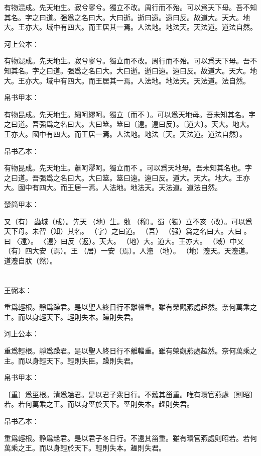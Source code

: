 \documentclass[a5paper]{ctexbook}
\begin{document}
    有物混成。先天地生。寂兮寥兮。獨立不改。周行而不殆。可以爲天下母。吾不知其名。字之曰道。强爲之名曰大。大曰逝。逝曰遠。遠曰反。故道大。天大。地大。王亦大。域中有四大。而王居其一焉。人法地。地法天。天法道。道法自然。

    河上公本：

    有物混成。先天地生。寂兮寥兮。獨立而不改。周行而不殆。可以爲天下母。吾不知其名。字之曰道。强爲之名曰大。大曰逝。逝曰遠。遠曰反。故道大。天大。地大。王亦大。域中有四大。而王居其一焉。人法地。地法天。天法道。法自然。

    帛书甲本：

    有物昆成。先天地生。繡呵繆呵。獨立〔而不󱁡〕。可以爲天地母。吾未知其名。字之曰道。吾强爲之名曰大。大曰筮。筮曰〔遠。遠曰反〕。〔道大〕。天大。地大。王亦大。國中有四大。而王居一焉。人法地。地法〔天。天法道。道法自然〕。

    帛书乙本：

    有物昆成。先天地生。蕭呵漻呵。獨立而不󱁡。可以爲天地母。吾未知其名也。字之曰道。吾强爲之名曰大。大曰筮。筮曰遠。遠曰反。道大。天大。地大。王亦大。國中有四大。而王居一焉。人法地。地法天。天法道。道法自然。

    楚简甲本：

    又（有）󶴷蟲城（成）。先天󶴵（地）生。敓󶴸（穆）。蜀（獨）立不亥（改）。可以爲天下母。未智（知）其名。󼼐（字）之曰道。󼾲（吾）󶴔（强）爲之名曰大。大曰󶴹。󶴹曰󶴿〈遠〉。󶴿〈遠〉曰反（返）。天大。󶴵（地）大。道大。王亦大。󶴺（域）中又（有）四大安（焉）。王󶵀（居）一安（焉）。人灋󶴵（地）。󶴵（地）灋天。天灋道。道灋自肰（然）。

    \chapter{}
    王弼本：

    重爲輕根。靜爲躁君。是以聖人終日行不離輜重。雖有榮觀燕處超然。奈何萬乘之主。而以身輕天下。輕則失本。躁則失君。

    河上公本：

    重爲輕根。靜爲躁君。是以聖人終日行不離輜重。雖有榮觀燕處超然。奈何萬乘之主。而以身輕天下。輕則失臣。躁則失君。

    帛书甲本：

    〔重〕爲巠根。清爲趮君。是以君子衆日行。不蘺其甾重。唯有環官燕處〔則昭〕若。若何萬乘之王。而以身巠於天下。巠則失本。趮則失君。

    帛书乙本：

    重爲輕根。静爲趮君。是以君子冬日行。不遠其甾重。雖有環官燕處則昭若。若何萬乘之王。而以身輕於天下。輕則失本。趮則失君。
\end{document}
